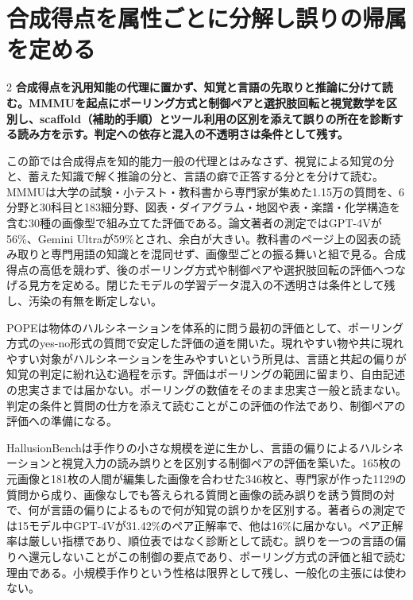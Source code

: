 \documentclass[lualatex,a4paper,10pt]{jlreq}
\begin{document}
\Needspace{0.20\textheight}
\section{合成得点を属性ごとに分解し誤りの帰属を定める}
\label{sec:p10}
\begin{multicols}{2}
\raggedcolumns
\noindent\textbf{合成得点を汎用知能の代理に置かず、知覚と言語の先取りと推論に分けて読む。MMMUを起点にポーリング方式と制御ペアと選択肢回転と視覚数学を区別し、scaffold（補助的手順）とツール利用の区別を添えて誤りの所在を診断する読み方を示す。判定への依存と混入の不透明さは条件として残す。}\autocite{vmd078,vmd080,vmd082}\par\medskip
\noindent この節では合成得点を知的能力一般の代理とはみなさず、視覚による知覚の分と、蓄えた知識で解く推論の分と、言語の癖で正答する分とを分けて読む。MMMUは大学の試験・小テスト・教科書から専門家が集めた1.15万の質問を、6分野と30科目と183細分野、図表・ダイアグラム・地図や表・楽譜・化学構造を含む30種の画像型で組み立てた評価である。論文著者の測定ではGPT-4Vが56\%、Gemini Ultraが59\%とされ、余白が大きい。教科書のページ上の図表の読み取りと専門用語の知識とを混同せず、画像型ごとの振る舞いと組で見る。合成得点の高低を競わず、後のポーリング方式や制御ペアや選択肢回転の評価へつなげる見方を定める。閉じたモデルの学習データ混入の不透明さは条件として残し、汚染の有無を断定しない。\autocite{vmd078}\par\medskip
\noindent POPEは物体のハルシネーションを体系的に問う最初の評価として、ポーリング方式のyes-no形式の質問で安定した評価の道を開いた。現れやすい物や共に現れやすい対象がハルシネーションを生みやすいという所見は、言語と共起の偏りが知覚の判定に紛れ込む過程を示す。評価はポーリングの範囲に留まり、自由記述の忠実さまでは届かない。ポーリングの数値をそのまま忠実さ一般と読まない。判定の条件と質問の仕方を添えて読むことがこの評価の作法であり、制御ペアの評価への準備になる。\autocite{vmd079}\par\medskip
\noindent HallusionBenchは手作りの小さな規模を逆に生かし、言語の偏りによるハルシネーションと視覚入力の読み誤りとを区別する制御ペアの評価を築いた。165枚の元画像と181枚の人間が編集した画像を合わせた346枚と、専門家が作った1129の質問から成り、画像なしでも答えられる質問と画像の読み誤りを誘う質問の対で、何が言語の偏りによるもので何が知覚の誤りかを区別する。著者らの測定では15モデル中GPT-4Vが31.42\%のペア正解率で、他は16\%に届かない。ペア正解率は厳しい指標であり、順位表ではなく診断として読む。誤りを一つの言語の偏りへ還元しないことがこの制御の要点であり、ポーリング方式の評価と組で読む理由である。小規模手作りという性格は限界として残し、一般化の主張には使わない。\autocite{vmd080}\par\medskip

\end{multicols}
\end{document}
